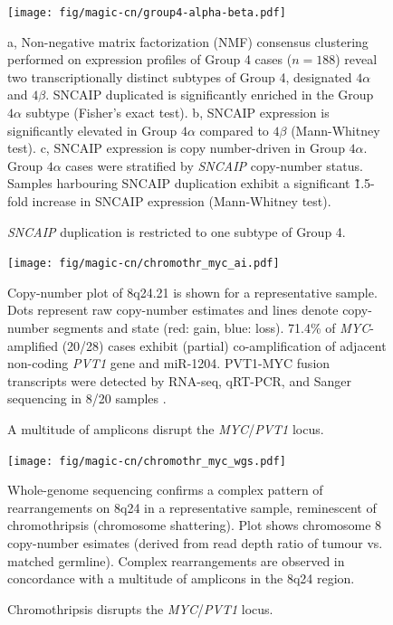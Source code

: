 \documentclass[11pt,letterpaper]{article}
\theoremstyle{definition}
\begin{document}
\begin{figure}[h]
	\begin{center}
		\texttt{[image: fig/magic-cn/group4-alpha-beta.pdf]}
	\end{center}
	\caption{\emph{SNCAIP} duplication is restricted to one subtype of Group 4.}
	\textsf{a}, Non-negative matrix factorization (NMF) consensus clustering performed on expression profiles of Group 4 cases ($n = 188$) reveal two transcriptionally distinct subtypes of Group 4, designated $4\alpha$ and $4\beta$. SNCAIP duplicated is significantly enriched in the Group $4\alpha$ subtype (Fisher's exact test).
	\textsf{b}, SNCAIP expression is significantly elevated in Group $4\alpha$ compared to $4\beta$ (Mann-Whitney test).
	\textsf{c}, SNCAIP expression is copy number-driven in Group $4\alpha$. Group $4\alpha$ cases were stratified by \emph{SNCAIP} copy-number status. Samples harbouring SNCAIP duplication exhibit a significant \~1.5-fold increase in SNCAIP expression (Mann-Whitney test).
	\label{fig:group4-alpha-beta}
\end{figure}

\clearpage



\begin{figure}[h]
	\begin{center}
		\texttt{[image: fig/magic-cn/chromothr\_myc\_ai.pdf]}
	\end{center}
	\caption{A multitude of amplicons disrupt the \emph{MYC}/\emph{PVT1} locus.}
	Copy-number plot of 8q24.21 is shown for a representative sample. Dots represent raw copy-number estimates and lines denote copy-number segments and state (red: gain, blue: loss). 71.4\% of \emph{MYC}-amplified (20/28) cases exhibit (partial) co-amplification of adjacent non-coding \emph{PVT1} gene and miR-1204. PVT1-MYC fusion transcripts were detected by RNA-seq, qRT-PCR, and Sanger sequencing in 8/20 samples .
	\label{fig:chromothr_myc}
\end{figure}

\begin{figure}[h]
	\begin{center}
		\texttt{[image: fig/magic-cn/chromothr\_myc\_wgs.pdf]}
	\end{center}
	\caption{Chromothripsis disrupts the \emph{MYC}/\emph{PVT1} locus.}
	Whole-genome sequencing confirms a complex pattern of rearrangements on 8q24 in a representative sample, reminescent of chromothripsis (chromosome shattering).
	Plot shows chromosome 8 copy-number esimates (derived from read depth ratio of tumour vs. matched germline).
	Complex rearrangements are observed in concordance with a multitude of amplicons in the 8q24 region.
	\label{fig:chromothr_myc_wgs}
\end{figure}
\end{document}
